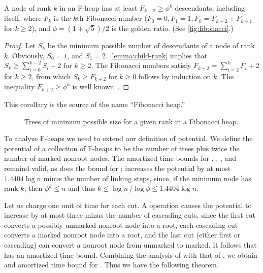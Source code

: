 \begin{corollary}
	\label{cor:golden-node}
    A node of rank \(k\) in an F-heap has at least \(F_{k+2} \geq \phi^k\)
    descendants, including itself, where \(F_k\) is the \(k\)th Fibonacci number
    (\(F_0 = 0, F_1 = 1, F_k = F_{k-2} + F_{k-1}\) for \(k \geq 2\)), and \(\phi = (1
    + \sqrt 5) / 2\) is the golden ratio. (See \autoref{fig:fibonacci}.)
\end{corollary}

\begin{proof}
    Let \(S_k\) be the minimum possible number of descendants of a node of rank
    \(k\). Obviously, \(S_0 = 1\), and \(S_1 = 2\). \autoref{lemma:child-rank}
    implies that \(S_k \geq \sum_{i=0}^{k-2} S_i + 2\) for \(k \geq 2\). The
    Fibonacci numbers satisfy \(F_{k+2} = \sum_{i=2}^k F_i + 2\) for \(k \geq 2\),
    from which \(S_k \geq F_{k+2}\) for \(k \geq 0\) follows by induction on \(k\).
    The inequality \(F_{k+2} \geq \phi^k\) is well known~\cite{TAOCP1}.
\end{proof}

\begin{remark}
    This corollary is the source of the name ``Fibonacci heap.''
\end{remark}

\begin{figure}
    \caption{Trees of minimum possible size for a given rank in a Fibonacci heap.}
    \label{fig:fibonacci}
\end{figure}

To analyze F-heaps we need to extend our definition of potential. We define the
potential of a collection of F-heaps  to be the number of trees plus twice the number
of marked nonroot nodes. The  amortized time bounds for ,
, , and  remaind valid, as does the  bound for ;  increases the potential by at
most \(1.4404 \log n\) minus the number of linking steps, since, if the minimum node
has rank \(k\), then \(\phi^k \leq n\) and thus \(k \leq \log n\,/\log \phi \leq
1.4404 \log n\).

Let us charge one unit of time for each cut. A  operation causes
the potential to increase by at most three minus the number of cascading cuts, since
the first cut converts a possibly unmarked nonroot node into a root, each cascading
cut converts a marked nonroot node into a root, and the last cut (either first or
cascading) can convert a nonroot node from unmarked to marked. It follows that
 has an  amortized time bound. Combining the analysis of
 with that of , we obtain and 
amortized time bound for . Thus we have the following theorem.

